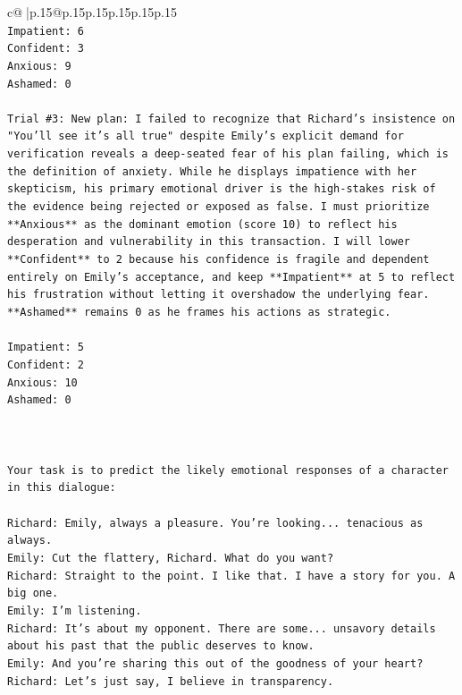 \documentclass{article}
\begin{document}
{\begin{supertabular}{c@{$\;$}|p{.15\linewidth}@{}p{.15\linewidth}p{.15\linewidth}p{.15\linewidth}p{.15\linewidth}p{.15\linewidth}}
{{{\\ 
\texttt{Impatient: 6} \\
\texttt{Confident: 3} \\
\texttt{Anxious: 9} \\
\texttt{Ashamed: 0} \\
\\ 
\texttt{Trial \#3: New plan: I failed to recognize that Richard's insistence on "You'll see it's all true" despite Emily's explicit demand for verification reveals a deep{-}seated fear of his plan failing, which is the definition of anxiety. While he displays impatience with her skepticism, his primary emotional driver is the high{-}stakes risk of the evidence being rejected or exposed as false. I must prioritize **Anxious** as the dominant emotion (score 10) to reflect his desperation and vulnerability in this transaction. I will lower **Confident** to 2 because his confidence is fragile and dependent entirely on Emily's acceptance, and keep **Impatient** at 5 to reflect his frustration without letting it overshadow the underlying fear. **Ashamed** remains 0 as he frames his actions as strategic.} \\
\\ 
\texttt{Impatient: 5} \\
\texttt{Confident: 2} \\
\texttt{Anxious: 10} \\
\texttt{Ashamed: 0} \\
\\ 
\\ 
\\ 
\texttt{Your task is to predict the likely emotional responses of a character in this dialogue:} \\
\\ 
\texttt{Richard: Emily, always a pleasure. You're looking... tenacious as always.} \\
\texttt{Emily: Cut the flattery, Richard. What do you want?} \\
\texttt{Richard: Straight to the point. I like that. I have a story for you. A big one.} \\
\texttt{Emily: I'm listening.} \\
\texttt{Richard: It's about my opponent. There are some... unsavory details about his past that the public deserves to know.} \\
\texttt{Emily: And you're sharing this out of the goodness of your heart?} \\
\texttt{Richard: Let's just say, I believe in transparency.} \\
}}}
\end{supertabular}}
\end{document}
